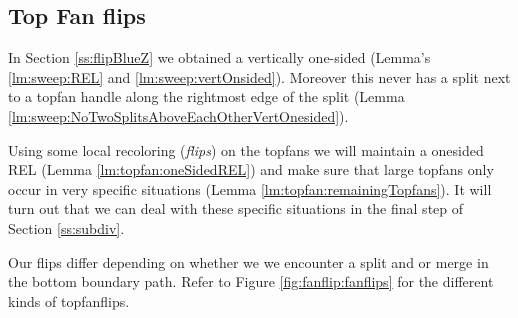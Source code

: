 
\subsection{Top Fan flips}
\thispagestyle{plain}
\label{ss:fanflip}

In Section \ref{ss:flipBlueZ} we obtained a vertically one-sided \rel (Lemma's \ref{lm:sweep:REL} and \ref{lm:sweep:vertOnsided}).
Moreover this \rel never has a split next to a topfan handle along the rightmost edge of the split (Lemma \ref{lm:sweep:NoTwoSplitsAboveEachOtherVertOnesided}). 

Using some local recoloring (\emph{flips}) on the topfans we will maintain a onesided REL (Lemma \ref{lm:topfan:oneSidedREL}) and make sure that large topfans only occur in very specific situations (Lemma \ref{lm:topfan:remainingTopfans}). It will turn out that we can deal with these specific situations in the final step of Section \ref{ss:subdiv}.

Our flips differ depending on whether we we encounter a split and or merge in the bottom boundary path. Refer to Figure \ref{fig:fanflip:fanflips} for the different kinds of topfanflips.


